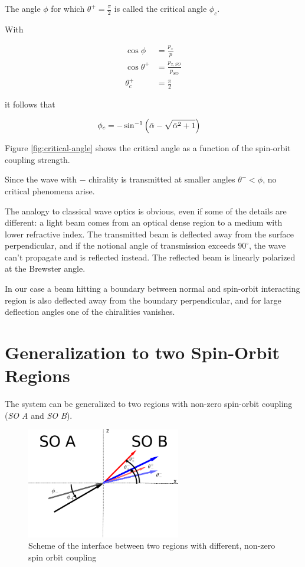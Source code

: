 The angle $\phi$ for which $\theta^+ =\frac{\pi}{2}$ is called the
critical angle $\phi_c$.

With

\begin{align}
    \cos \phi       &= \frac{p_x}{p}\\
    \cos \theta^+   &= \frac{p_{x,SO}}{p_{SO}}\\
    \theta_c^+      &= \frac{\pi}{2}
\end{align}

it follows that

\begin{align}
    \phi_c          &= -\sin ^{-1}\left(\tilde \alpha-\sqrt{\tilde \alpha^2+1}\right)
\end{align}

Figure \ref{fig:critical-angle} shows the critical angle as a function
of the spin-orbit coupling strength.

Since the wave with $-$ chirality is transmitted at smaller angles
$\theta^- < \phi$, no critical phenomena arise.

The analogy to classical wave optics is obvious, even if some of the
details are different: a light beam comes from an optical dense
region to a medium with lower refractive index. The transmitted beam
is deflected away from the surface perpendicular, and if the notional
angle of transmission
exceeds $90^\circ$, the wave can't propagate and is reflected instead.
The reflected beam is linearly polarized at the Brewster angle.

In our case a beam hitting a boundary between normal and spin-orbit
interacting region is also deflected away from the boundary
perpendicular, and for large deflection angles one of the chiralities
vanishes.

\section{Generalization to two Spin-Orbit Regions}

The system can be generalized to two regions with non-zero spin-orbit
coupling (\emph{SO A} and \emph{SO B}).

\begin{figure}[htb]
    \begin{center}
        \includegraphics[width=0.6\textwidth]{setup-two-so-regions.pdf}
    \end{center}
    \caption{Scheme of the interface between two regions with
        different, non-zero spin orbit coupling}
    \label{fig:setup-nonzero}
\end{figure}

